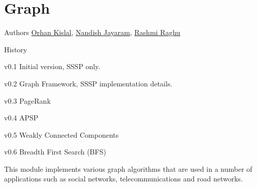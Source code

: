 



\chapter[Graph]{Graph}

\begin{moduleinfo}
\item[Authors] \href{mailto:okislal@pivotal.io}{Orhan Kislal}, \href{mailto:njayaram@pivotal.io}{Nandish Jayaram}, \href{mailto:rraghu@pivotal.io}{Rashmi Raghu}
\item[History]
	\begin{modulehistory}
		\item[v0.1] Initial version, SSSP only.
		\item[v0.2] Graph Framework, SSSP implementation details.
        \item[v0.3] PageRank
        \item[v0.4] APSP
        \item[v0.5] Weakly Connected Components
        \item[v0.6] Breadth First Search (BFS)
	\end{modulehistory}
\end{moduleinfo}



This module implements various graph algorithms that are used in a number of
applications such as social networks, telecommunications and road networks.

